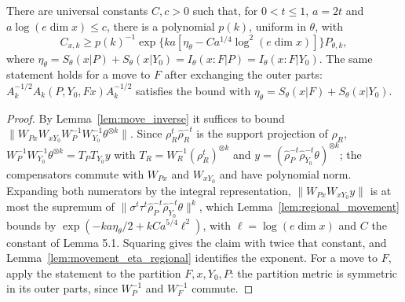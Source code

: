\begin{theorem}
    \label{thm:relative_pin}
    \leanok
    There are universal constants $C,c>0$ such that, for $0<t\le1$, $a=2t$ and
    $a\log(e\dim x)\le c$, there is a polynomial $p(k)$, uniform in $\theta$, with
    \[
        C_{x,k}\ge p(k)^{-1}\exp\bigl\{ka[\eta_\theta-Ca^{1/4}\log^2(e\dim x)]\bigr\}
            P_{\theta,k},
    \]
    where $\eta_\theta=S_\theta(x|P)+S_\theta(x|Y_0)=I_\theta(x:F|P)=I_\theta(x:F|Y_0)$. The
    same statement holds for a move to $F$ after exchanging the outer parts:
    $A_k^{-1/2}A_k(P,Y_0,Fx)A_k^{-1/2}$ satisfies the bound with
    $\eta_\theta=S_\theta(x|F)+S_\theta(x|Y_0)$.
\end{theorem}

\begin{proof}\leanok
    By Lemma~\ref{lem:move_inverse} it suffices to bound
    $\|W_{Px}W_{xY_0}W_P^{-1}W_{Y_0}^{-1}\theta^{\otimes k}\|$. Since $\rho_R^t\hat\rho_R^{-t}$ is
    the support projection of $\rho_R$, $W_P^{-1}W_{Y_0}^{-1}\theta^{\otimes k}=T_PT_{Y_0}y$ with
    $T_R=W_R^{-1}(\rho_R^t)^{\otimes k}$ and $y=(\hat\rho_P^{-t}\hat\rho_{Y_0}^{-t}\theta)^{\otimes k}$;
    the compensators commute with $W_{Px}$ and $W_{xY_0}$ and have polynomial norm. Expanding
    both numerators by the integral representation,
    $\|W_{Px}W_{xY_0}y\|$ is at most the supremum of
    $\|\sigma^t\tau^t\hat\rho_P^{-t}\hat\rho_{Y_0}^{-t}\theta\|^k$, which
    Lemma~\ref{lem:regional_movement} bounds by $\exp(-ka\eta_\theta/2+kCa^{5/4}\ell^2)$, with
    $\ell=\log(e\dim x)$ and $C$ the constant of Lemma 5.1. Squaring gives the claim with twice
    that constant, and Lemma~\ref{lem:movement_eta_regional} identifies the exponent. For a move
    to $F$, apply the statement to the partition $F,x,Y_0,P$: the partition metric is symmetric in
    its outer parts, since $W_P^{-1}$ and $W_F^{-1}$ commute.
\end{proof}

